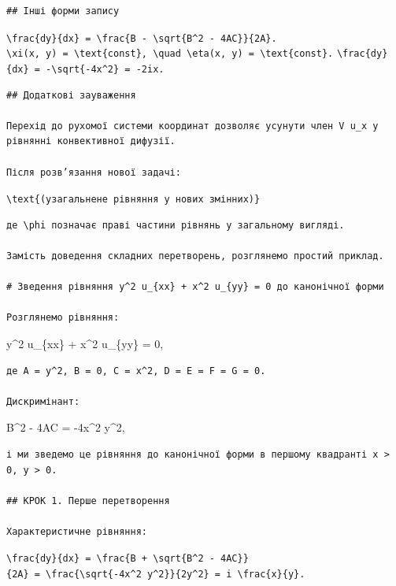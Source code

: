 \documentclass[
  ukrainian,
]{article}
\begin{document}
\begin{verbatim}
## Інші форми запису
\end{verbatim}

\texttt{\textbackslash{}frac\{dy\}\{dx\}\ =\ \textbackslash{}frac\{B\ -\ \textbackslash{}sqrt\{B\^{}2\ -\ 4AC\}\}\{2A\}.}
\texttt{\textbackslash{}xi(x,\ y)\ =\ \textbackslash{}text\{const\},\ \textbackslash{}quad\ \textbackslash{}eta(x,\ y)\ =\ \textbackslash{}text\{const\}.}
\texttt{\textbackslash{}frac\{dy\}\{dx\}\ =\ -\textbackslash{}sqrt\{-4x\^{}2\}\ =\ -2ix.}

\begin{verbatim}
## Додаткові зауваження

Перехід до рухомої системи координат дозволяє усунути член V u_x у рівнянні конвективної дифузії.

Після розв’язання нової задачі:
\end{verbatim}

\texttt{\textbackslash{}text\{(узагальнене\ рівняння\ у\ нових\ змінних)\}}

\begin{verbatim}
де \phi позначає праві частини рівнянь у загальному вигляді.

Замість доведення складних перетворень, розглянемо простий приклад.

# Зведення рівняння y^2 u_{xx} + x^2 u_{yy} = 0 до канонічної форми

Розглянемо рівняння:
\end{verbatim}

y\^{}2 u\_\{xx\} + x\^{}2 u\_\{yy\} = 0,

\begin{verbatim}
де A = y^2, B = 0, C = x^2, D = E = F = G = 0.

Дискримінант:
\end{verbatim}

B\^{}2 - 4AC = -4x\^{}2 y\^{}2,

\begin{verbatim}
і ми зведемо це рівняння до канонічної форми в першому квадранті x > 0, y > 0.

## КРОК 1. Перше перетворення

Характеристичне рівняння:
\end{verbatim}

\texttt{\textbackslash{}frac\{dy\}\{dx\}\ =\ \textbackslash{}frac\{B\ +\ \textbackslash{}sqrt\{B\^{}2\ -\ 4AC\}\}\{2A\}\ =\ \textbackslash{}frac\{\textbackslash{}sqrt\{-4x\^{}2\ y\^{}2\}\}\{2y\^{}2\}\ =\ i\ \textbackslash{}frac\{x\}\{y\}.}
\end{document}
